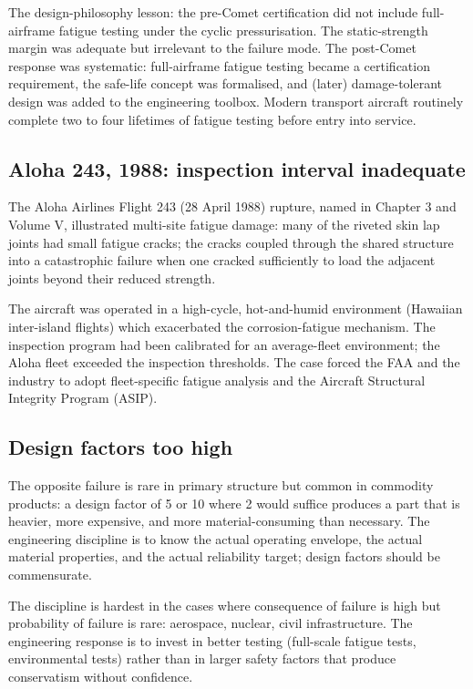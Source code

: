The design-philosophy lesson: the pre-Comet certification did not include full-airframe fatigue testing under the cyclic pressurisation. The static-strength margin was adequate but irrelevant to the failure mode. The post-Comet response was systematic: full-airframe fatigue testing became a certification requirement, the safe-life concept was formalised, and (later) damage-tolerant design was added to the engineering toolbox. Modern transport aircraft routinely complete two to four lifetimes of fatigue testing before entry into service.

\subsection{Aloha 243, 1988: inspection interval inadequate}

The Aloha Airlines Flight 243 (28 April 1988) \cite{acc:ntsb-aar94-04} rupture, named in Chapter 3 and Volume V, illustrated multi-site fatigue damage: many of the riveted skin lap joints had small fatigue cracks; the cracks coupled through the shared structure into a catastrophic failure when one cracked sufficiently to load the adjacent joints beyond their reduced strength.

The aircraft was operated in a high-cycle, hot-and-humid environment (Hawaiian inter-island flights) which exacerbated the corrosion-fatigue mechanism. The inspection program had been calibrated for an average-fleet environment; the Aloha fleet exceeded the inspection thresholds. The case forced the FAA and the industry to adopt fleet-specific fatigue analysis and the Aircraft Structural Integrity Program (ASIP).

\subsection{Design factors too high}

The opposite failure is rare in primary structure but common in commodity products: a design factor of 5 or 10 where 2 would suffice produces a part that is heavier, more expensive, and more material-consuming than necessary. The engineering discipline is to know the actual operating envelope, the actual material properties, and the actual reliability target; design factors should be commensurate.

The discipline is hardest in the cases where consequence of failure is high but probability of failure is rare: aerospace, nuclear, civil infrastructure. The engineering response is to invest in better testing (full-scale fatigue tests, environmental tests) rather than in larger safety factors that produce conservatism without confidence.

